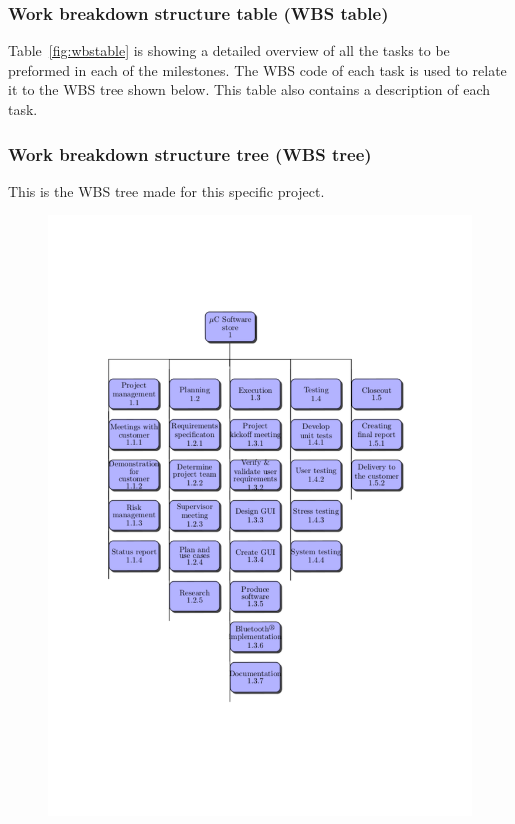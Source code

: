 \subsubsection{Work breakdown structure table (WBS table)}
Table~\ref{fig:wbstable} is showing a detailed overview of all the tasks to be preformed in each of the milestones. The WBS code of each task is used to relate it to the WBS tree shown below. This table also contains a description of each task.


\newpage
\subsubsection{Work breakdown structure tree (WBS tree)}
This is the WBS tree made for this specific project.

\begin{figure}[H]
\hspace*{-1.2in}
\includegraphics[trim=0cm 5cm 0cm 4cm,clip=true]{figures/wbs-tree2.pdf}
\end{figure}

